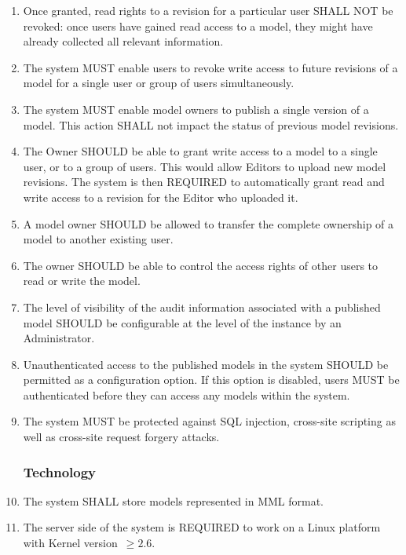 \begin{enumerate}[1]
\item Once granted, read rights to a revision for a particular user SHALL NOT be revoked: once users have gained read access to a model, they might have already collected all relevant information.

\item The system MUST enable users to revoke write access to future revisions of a model for a single user or group of users simultaneously.

\item The system MUST enable model owners to publish a single version of a model. This action SHALL not impact the status of previous model revisions. 

\item The Owner SHOULD be able to grant write access to a model to a single user, or to a group of users. This would allow Editors to upload new model revisions. The system is then REQUIRED to automatically grant read and write access to a revision for the Editor who uploaded it.

\item A model owner SHOULD be allowed to transfer the complete ownership of a model to another existing user.

\item The owner SHOULD be able to control the access rights of other users to read or write the model.

\item The level of visibility of the audit information associated with a published model SHOULD be configurable at the level of the instance by an Administrator.

\item Unauthenticated access to the published models in the system SHOULD be permitted as a configuration option. If this option is disabled, users MUST be authenticated before they can access any models within the system.

\item The system MUST be protected against SQL injection, cross-site scripting as well as cross-site request forgery attacks. 

\subsubsection{Technology}
\item The system SHALL store models represented in MML format.

\item The server side of the system is REQUIRED to work on a Linux platform with Kernel version~$\ge 2.6$. 


\end{enumerate}
